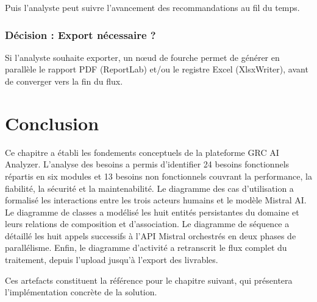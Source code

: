Puis l'analyste peut suivre l'avancement des recommandations au fil
du temps.

\subsubsection*{Décision : Export nécessaire ?}

Si l'analyste souhaite exporter, un nœud de fourche permet de générer
en parallèle le rapport PDF (ReportLab) et/ou le registre Excel
(XlsxWriter), avant de converger vers la fin du flux.

\section*{Conclusion}

Ce chapitre a établi les fondements conceptuels de la plateforme GRC AI
Analyzer. L'analyse des besoins a permis d'identifier 24 besoins
fonctionnels répartis en six modules et 13 besoins non fonctionnels
couvrant la performance, la fiabilité, la sécurité et la maintenabilité.
Le diagramme des cas d'utilisation a formalisé les interactions entre les
trois acteurs humains et le modèle Mistral AI. Le diagramme de classes a
modélisé les huit entités persistantes du domaine et leurs relations de
composition et d'association. Le diagramme de séquence a détaillé les
huit appels successifs à l'API Mistral orchestrés en deux phases de
parallélisme. Enfin, le diagramme d'activité a retranscrit le flux complet
du traitement, depuis l'upload jusqu'à l'export des livrables.

Ces artefacts constituent la référence pour le chapitre suivant, qui
présentera l'implémentation concrète de la solution.
